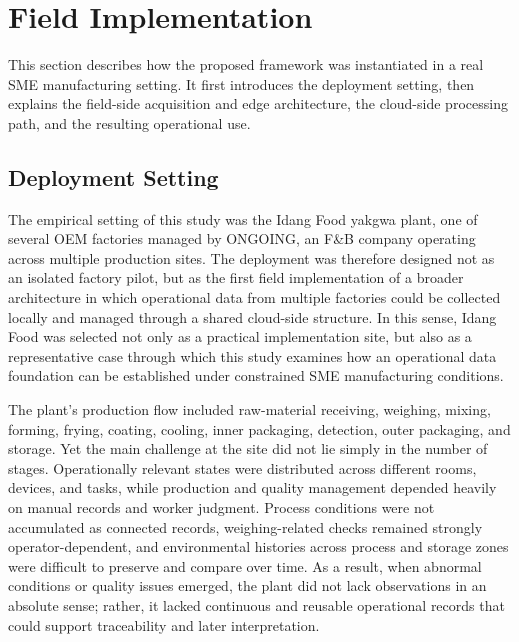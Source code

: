 \documentclass[systems,article,accept,pdftex,moreauthors]{Definitions/mdpi}
\begin{document}
\section{Field Implementation}
\label{sec:field_implementation}

This section describes how the proposed framework was instantiated in a real SME manufacturing setting. It first introduces the deployment setting, then explains the field-side acquisition and edge architecture, the cloud-side processing path, and the resulting operational use.

\subsection{Deployment Setting}
\label{sec:deployment_setting}




The empirical setting of this study was the Idang Food yakgwa plant, one of several OEM factories managed by ONGOING, an F\&B company operating across multiple production sites. The deployment was therefore designed not as an isolated factory pilot, but as the first field implementation of a broader architecture in which operational data from multiple factories could be collected locally and managed through a shared cloud-side structure. In this sense, Idang Food was selected not only as a practical implementation site, but also as a representative case through which this study examines how an operational data foundation can be established under constrained SME manufacturing conditions.

The plant's production flow included raw-material receiving, weighing, mixing, forming, frying, coating, cooling, inner packaging, detection, outer packaging, and storage. Yet the main challenge at the site did not lie simply in the number of stages. Operationally relevant states were distributed across different rooms, devices, and tasks, while production and quality management depended heavily on manual records and worker judgment. Process conditions were not accumulated as connected records, weighing-related checks remained strongly operator-dependent, and environmental histories across process and storage zones were difficult to preserve and compare over time. As a result, when abnormal conditions or quality issues emerged, the plant did not lack observations in an absolute sense; rather, it lacked continuous and reusable operational records that could support traceability and later interpretation.
\end{document}
